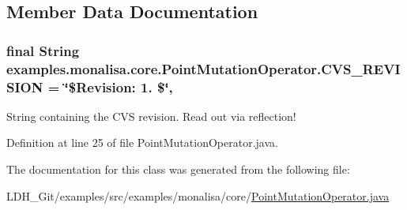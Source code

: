 \subsection{Member Data Documentation}
\hypertarget{classexamples_1_1monalisa_1_1core_1_1_point_mutation_operator_af752ce4312a010c302a6e694ff4b29c0}{
\subsubsection[{C\-V\-S\-\_\-\-R\-E\-V\-I\-S\-I\-O\-N}]{\setlength{\rightskip}{0pt plus 5cm}final String examples.\-monalisa.\-core.\-Point\-Mutation\-Operator.\-C\-V\-S\-\_\-\-R\-E\-V\-I\-S\-I\-O\-N = \char`\"{}\$Revision\-: 1. \$\char`\"{}\hspace{0.3cm}{\ttfamily [static]}, {\ttfamily [private]}}}\label{classexamples_1_1monalisa_1_1core_1_1_point_mutation_operator_af752ce4312a010c302a6e694ff4b29c0}
String containing the C\-V\-S revision. Read out via reflection! 

Definition at line 25 of file Point\-Mutation\-Operator.\-java.



The documentation for this class was generated from the following file\-:\begin{DoxyCompactItemize}
\item 
L\-D\-H\-\_\-\-Git/examples/src/examples/monalisa/core/\hyperlink{_point_mutation_operator_8java}{Point\-Mutation\-Operator.\-java}\end{DoxyCompactItemize}
